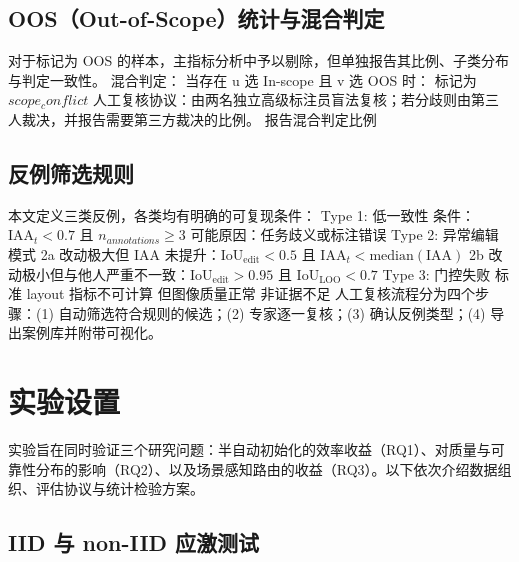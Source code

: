 \documentclass[journal,onecolumn]{IEEEtran}
\begin{document}
\subsection{OOS（Out-of-Scope）统计与混合判定}

对于标记为 OOS 的样本，主指标分析中予以剔除，但单独报告其比例、子类分布与判定一致性。
混合判定：
当存在 u 选 In-scope 且 v 选 OOS 时：
标记为 $scope_conflict$
人工复核协议：由两名独立高级标注员盲法复核；若分歧则由第三人裁决，并报告需要第三方裁决的比例。
报告混合判定比例

\subsection{反例筛选规则}

本文定义三类反例，各类均有明确的可复现条件：
Type 1: 低一致性
条件：$\mathrm{IAA}_t<0.7$ 且 $n_{annotations}\geq3$
可能原因：任务歧义或标注错误
Type 2: 异常编辑模式
2a 改动极大但 $\mathrm{IAA}$ 未提升：$\mathrm{IoU}_{\mathrm{edit}}<0.5$ 且 $\mathrm{IAA}_t<\mathrm{median}(\mathrm{IAA})$
2b 改动极小但与他人严重不一致：$\mathrm{IoU}_{\mathrm{edit}}>0.95$ 且 $\mathrm{IoU}_{\mathrm{LOO}}<0.7$
Type 3: 门控失败
标准 layout 指标不可计算
但图像质量正常 非证据不足
人工复核流程分为四个步骤：(1) 自动筛选符合规则的候选；(2) 专家逐一复核；(3) 确认反例类型；(4) 导出案例库并附带可视化。

\section{实验设置}

实验旨在同时验证三个研究问题：半自动初始化的效率收益（RQ1）、对质量与可靠性分布的影响（RQ2）、以及场景感知路由的收益（RQ3）。以下依次介绍数据组织、评估协议与统计检验方案。
\subsection{IID 与 non-IID 应激测试}
\end{document}
